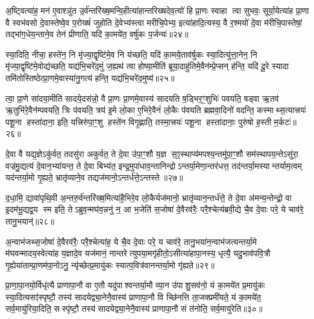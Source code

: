 अ॒ष्ट्वित्या॑ह॒ मन॑ ए॒वाश्ञु॑त उ॒र्व॑न्तरि॑ख्ष॒मन्वि॒हीत्या॑हान्तरिख्षदेव॒त्यो॑ हि प्रा॒णः स्वाहा त्वा सुभवः॒ सूर्या॒येत्या॑ह प्रा॒णा वै स्वभ॑वसो दे॒वास्तेष्वे॒व प॒रोख्षं॑ जुहोति दे॒वेभ्य॑स्त्वा मरीचि॒पेभ्य॒ इत्या॑हादि॒त्यस्य॒ वै र॒श्मयो॑ दे॒वा म॑रीचि॒पास्तेषां॒ तद्भा॑ग॒धेय॒न्ताने॒व तेन॑ प्रीणाति॒ यदि॑ का॒मये॑त॒ वर्\mbox{}षु॑कः प॒र्जन्यः॑॥२४॥

स्या॒दिति॒ नीचा॒ हस्ते॑न॒ नि मृ॑ज्या॒द्वृष्टि॑मे॒व नि य॑च्छति॒ यदि॑ का॒मये॒ताव॑र्\mbox{}षुकः स्या॒दित्यु॑त्ता॒नेन॒ नि मृ॑ज्या॒द्वृष्टि॑मे॒वोद्य॑च्छति॒ यद्य॑भि॒चरे॑द॒मुं ज॒ह्यथ॑ त्वा होष्या॒मीति॑ ब्रूया॒दाहु॑तिमे॒वैन॑म्प्रे॒प्सन् ह॑न्ति॒ यदि॑ दू॒रे स्यादा तमि॑तोस्तिष्ठेत्प्रा॒णमे॒वास्या॑नु॒गत्य॑ हन्ति॒ यद्य॑भि॒चरे॑द॒मुष्य॑॥२५॥

त्वा॒ प्रा॒णे सा॑दया॒मीति॑ सादये॒दस॑न्नो॒ वै प्रा॒णः प्रा॒णमे॒वास्य॑ सादयति ष॒ड्भिर॒ꣳ॒शुभिः॑ पवयति॒ षड्वा ऋ॒तव॑ ऋ॒तुभि॑रे॒वैन॑म्पवयति॒ त्रिः प॑वयति॒ त्रय॑ इ॒मे लो॒का ए॒भिरे॒वैनं॑ लो॒कैः प॑वयति ब्रह्मवा॒दिनो॑ वदन्ति॒ कस्माथ्स॒त्यात्त्रयः॑ पशू॒ना हस्ता॑दाना॒ इति॒ यत्त्रिरु॑पा॒ꣳ॒शु हस्ते॑न विगृ॒ह्णाति॒ तस्मा॒त्त्रयः॑ पशू॒ना हस्ता॑दानाः॒ पुरु॑षो ह॒स्ती म॒र्कटः॑॥२६॥

{\anuvakamend[{माध्य॑न्दिनम॒ष्टाव॑ष्टावे॒ष मन॑स्त्वा प॒र्जन्यो॒ऽमुष्य॒ पुरु॑षो॒ द्वे च॑॥५॥}]}

दे॒वा वै यद्य॒ज्ञेऽकु॑र्वत॒ तदसु॑रा अकुर्वत॒ ते दे॒वा उ॑पा॒ꣳ॒शौ य॒ज्ञ स॒ꣵ॒स्थाप्य॑मपश्य॒न्तमु॑पा॒ꣳ॒शौ सम॑स्थापय॒न्तेऽसु॑रा॒ वज्र॑मु॒द्यत्य॑ दे॒वान॒भ्या॑यन्त॒ ते दे॒वा बिभ्य॑त॒ इन्द्र॒मुपा॑धाव॒न्तानिन्द्रोऽन्तर्या॒मेणा॒न्तर॑धत्त॒ तद॑न्तर्या॒मस्यान्तर्याम॒त्वम् यद॑न्तर्या॒मो गृ॒ह्यते॒ भ्रातृ॑व्याने॒व तद्यज॑मानो॒ऽन्तर्ध॑त्ते॒ऽन्तस्ते॥२७॥

द॒धा॒मि॒ द्यावा॑पृथि॒वी अ॒न्तरु॒र्व॑न्तरि॑ख्ष॒मित्या॑है॒भिरे॒व लो॒कैर्यज॑मानो॒ भ्रातृ॑व्यान॒न्तर्ध॑त्ते॒ ते दे॒वा अ॑मन्य॒न्तेन्द्रो॒ वा इ॒दम॑भू॒द्यद्व॒य स्म इति॒ तेऽब्रुव॒न्मघ॑व॒न्ननु॑ न॒ आ भ॒जेति॑ स॒जोषा॑ दे॒वैरव॑रैः॒ परै॒श्चेत्य॑ब्रवी॒द्ये चै॒व दे॒वाः परे॒ ये चाव॑रे॒ तानु॒भयान्॑॥२८॥

अ॒न्वाभ॑जथ्स॒जोषा॑ दे॒वैरव॑रैः॒ परै॒श्चेत्या॑ह॒ ये चै॒व दे॒वाः परे॒ य चाव॑रे॒ तानु॒भया॑न॒न्वाभ॑जत्यन्तर्या॒मे म॑घवन्मादय॒स्वेत्या॑ह य॒ज्ञादे॒व यज॑मानं॒ नान्तरेत्युपया॒मगृ॑हीतो॒ऽसीत्या॑हापा॒नस्य॒ धृत्यै॒ यदु॒भाव॑पवि॒त्रौ गृ॒ह्येया॑ताम्प्रा॒णम॑पा॒नोऽनु॒ न्यृ॑च्छेत्प्र॒मायु॑कः स्यात्प॒वित्र॑वानन्तर्या॒मो गृ॑ह्यते॥२९॥

प्रा॒णा॒पा॒नयो॒र्विधृ॑त्यै प्राणापा॒नौ वा ए॒तौ यदु॑पाश्वन्तर्या॒मौ व्या॒न उ॑पाशु॒सव॑नो॒ यं का॒मये॑त प्र॒मायु॑कः स्या॒दित्यसꣵ॑स्पृष्टौ॒ तस्य॑ सादयेद्व्या॒नेनै॒वास्य॑ प्राणापा॒नौ वि च्छि॑नत्ति ता॒जक्प्रमी॑यते॒ यं का॒मये॑त॒ सर्व॒मायु॑रिया॒दिति॒ सस्पृ॑ष्टौ॒ तस्य॑ सादयेद्व्या॒नेनै॒वास्य॑ प्राणापा॒नौ सं त॑नोति॒ सर्व॒मायु॑रेति॥३०॥

